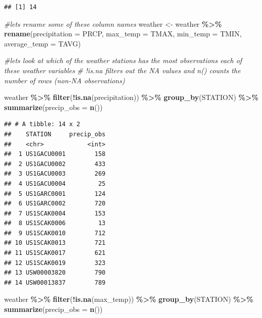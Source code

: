 \documentclass[
]{article}
\newenvironment{Shaded}{\begin{snugshade}}{\end{snugshade}}
\newcommand{\AttributeTok}[1]{\textcolor[rgb]{0.13,0.29,0.53}{#1}}
\newcommand{\CommentTok}[1]{\textcolor[rgb]{0.56,0.35,0.01}{\textit{#1}}}
\newcommand{\FunctionTok}[1]{\textcolor[rgb]{0.13,0.29,0.53}{\textbf{#1}}}
\newcommand{\NormalTok}[1]{#1}
\newcommand{\OtherTok}[1]{\textcolor[rgb]{0.56,0.35,0.01}{#1}}
\newcommand{\SpecialCharTok}[1]{\textcolor[rgb]{0.81,0.36,0.00}{\textbf{#1}}}
\begin{document}
\begin{verbatim}
## [1] 14
\end{verbatim}

\begin{Shaded}
\begin{Highlighting}[]
\CommentTok{\#let\textquotesingle{}s rename some of these column names}
\NormalTok{weather }\OtherTok{\textless{}{-}}\NormalTok{ weather }\SpecialCharTok{\%\textgreater{}\%} \FunctionTok{rename}\NormalTok{(}\AttributeTok{precipitation =}\NormalTok{ PRCP,}
      \AttributeTok{max\_temp =}\NormalTok{ TMAX,}
      \AttributeTok{min\_temp =}\NormalTok{ TMIN,}
      \AttributeTok{average\_temp =}\NormalTok{ TAVG)}

\CommentTok{\#let\textquotesingle{}s look at which of the weather stations has the most observations each of these weather variables}
\CommentTok{\# !is.na filters out the NA values and n() counts the number of rows (non{-}NA observations)}

\NormalTok{weather }\SpecialCharTok{\%\textgreater{}\%} \FunctionTok{filter}\NormalTok{(}\SpecialCharTok{!}\FunctionTok{is.na}\NormalTok{(precipitation)) }\SpecialCharTok{\%\textgreater{}\%}
  \FunctionTok{group\_by}\NormalTok{(STATION) }\SpecialCharTok{\%\textgreater{}\%}
  \FunctionTok{summarize}\NormalTok{(}\AttributeTok{precip\_obs =} \FunctionTok{n}\NormalTok{())}
\end{Highlighting}
\end{Shaded}

\begin{verbatim}
## # A tibble: 14 x 2
##    STATION     precip_obs
##    <chr>            <int>
##  1 US1GACU0001        158
##  2 US1GACU0002        433
##  3 US1GACU0003        269
##  4 US1GACU0004         25
##  5 US1GARC0001        124
##  6 US1GARC0002        720
##  7 US1SCAK0004        153
##  8 US1SCAK0006         13
##  9 US1SCAK0010        712
## 10 US1SCAK0013        721
## 11 US1SCAK0017        621
## 12 US1SCAK0019        323
## 13 USW00003820        790
## 14 USW00013837        789
\end{verbatim}

\begin{Shaded}
\begin{Highlighting}[]
\NormalTok{weather }\SpecialCharTok{\%\textgreater{}\%} \FunctionTok{filter}\NormalTok{(}\SpecialCharTok{!}\FunctionTok{is.na}\NormalTok{(max\_temp)) }\SpecialCharTok{\%\textgreater{}\%}
  \FunctionTok{group\_by}\NormalTok{(STATION) }\SpecialCharTok{\%\textgreater{}\%}
  \FunctionTok{summarize}\NormalTok{(}\AttributeTok{precip\_obs =} \FunctionTok{n}\NormalTok{())}
\end{Highlighting}
\end{Shaded}
\end{document}
